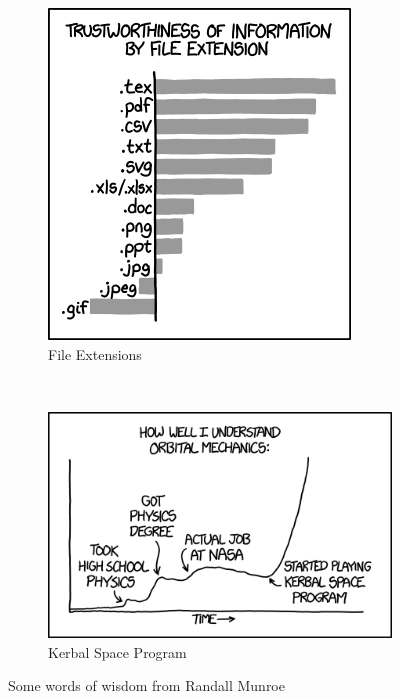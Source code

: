 \begin{figure}[htbp] 
    \centering 
    \begin{subfigure}[htbp]{0.5\textwidth} 
        \includegraphics[width=\textwidth]{figures/file_extensions.png} 
        \caption{File Extensions} \label{fig:ext} 
    \end{subfigure}~ %
    \begin{subfigure}[htbp]{0.5\textwidth} 
        \includegraphics[width=\textwidth]{figures/orbital_mechanics.png} 
        \caption{Kerbal Space Program} \label{fig:ksp} 
    \end{subfigure}
    \caption[XKCD]{Some words of wisdom from Randall Munroe}
    \label{fig:xkcd} 
\end{figure}


